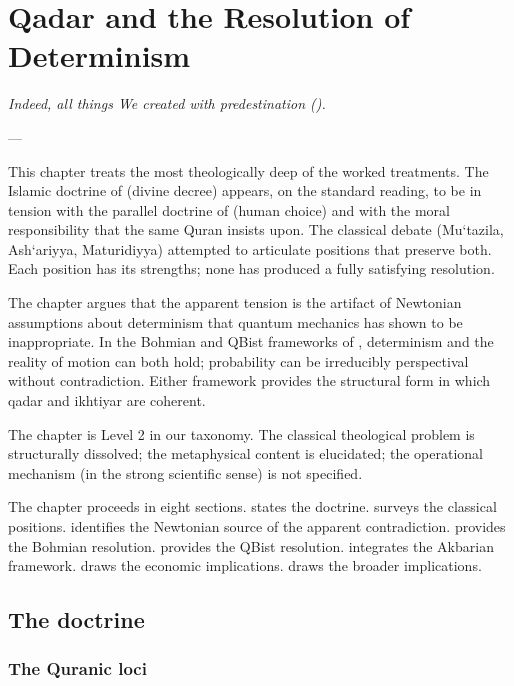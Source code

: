 \chapter{Qadar and the Resolution of Determinism}
\label{ch:qadar}

\epigraph{\itshape Indeed, all things We created with predestination
().}{--- }

\noindent
This chapter treats the most theologically deep of the worked
treatments. The Islamic doctrine of  (divine decree)
appears, on the standard reading, to be in tension with the
parallel doctrine of  (human choice) and with the
moral responsibility that the same Quran insists upon. The classical
 debate (Mu`tazila, Ash`ariyya, Maturidiyya) attempted
to articulate positions that preserve both. Each position has its
strengths; none has produced a fully satisfying resolution.

The chapter argues that the apparent tension is the artifact of
Newtonian assumptions about determinism that quantum mechanics has
shown to be inappropriate. In the Bohmian and QBist frameworks of
, determinism and the reality of
motion can both hold; probability can be irreducibly perspectival
without contradiction. Either framework provides the structural
form in which qadar and ikhtiyar are coherent.

The chapter is Level 2 in our taxonomy. The classical theological
problem is structurally dissolved; the metaphysical content is
elucidated; the operational mechanism (in the strong scientific
sense) is not specified.

The chapter proceeds in eight sections. 
states the doctrine.  surveys the classical
positions.  identifies the Newtonian source
of the apparent contradiction. 
provides the Bohmian resolution. 
provides the QBist resolution.  integrates
the Akbarian framework.  draws the economic
implications.  draws the broader
implications.

\section{The doctrine}
\label{sec:qad-claim}

\subsection{The Quranic loci}


